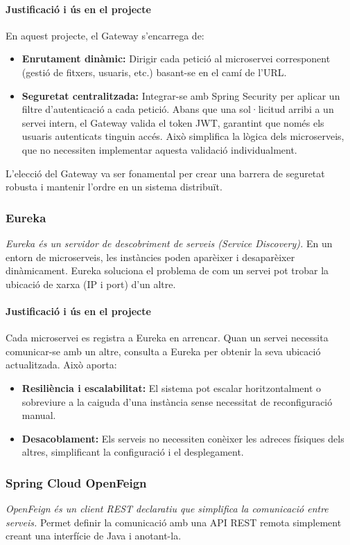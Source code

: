 \paragraph{Justificació i ús en el projecte}
En aquest projecte, el Gateway s'encarrega de:
\begin{itemize}
    \item \textbf{Enrutament dinàmic:} Dirigir cada petició al microservei corresponent (gestió de fitxers, usuaris, etc.) basant-se en el camí de l'URL.
    \item \textbf{Seguretat centralitzada:} Integrar-se amb Spring Security per aplicar un filtre d'autenticació a cada petició. Abans que una sol·licitud arribi a un servei intern, el Gateway valida el token JWT, garantint que només els usuaris autenticats tinguin accés. Això simplifica la lògica dels microserveis, que no necessiten implementar aquesta validació individualment.
\end{itemize}
L'elecció del Gateway va ser fonamental per crear una barrera de seguretat robusta i mantenir l'ordre en un sistema distribuït.

\subsubsection{Eureka}
\textit{Eureka és un servidor de descobriment de serveis (Service Discovery).} En un entorn de microserveis, les instàncies poden aparèixer i desaparèixer dinàmicament. Eureka soluciona el problema de com un servei pot trobar la ubicació de xarxa (IP i port) d'un altre.

\paragraph{Justificació i ús en el projecte}
Cada microservei es registra a Eureka en arrencar. Quan un servei necessita comunicar-se amb un altre, consulta a Eureka per obtenir la seva ubicació actualitzada. Això aporta:
\begin{itemize}
    \item \textbf{Resiliència i escalabilitat:} El sistema pot escalar horitzontalment o sobreviure a la caiguda d'una instància sense necessitat de reconfiguració manual.
    \item \textbf{Desacoblament:} Els serveis no necessiten conèixer les adreces físiques dels altres, simplificant la configuració i el desplegament.
\end{itemize}

\subsubsection{Spring Cloud OpenFeign}
\textit{OpenFeign és un client REST declaratiu que simplifica la comunicació entre serveis.} Permet definir la comunicació amb una API REST remota simplement creant una interfície de Java i anotant-la.

